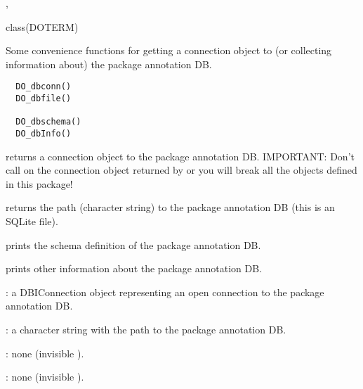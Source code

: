 \documentclass[a4paper]{book}
\begin{document}
%
\begin{SeeAlso}\relax
{},
\end{SeeAlso}
%
\begin{Examples}
\begin{ExampleCode}
   class(DOTERM)
\end{ExampleCode}
\end{Examples}
%
\begin{Description}\relax
Some convenience functions for getting a connection object to (or collecting
information about) the package annotation DB.
\end{Description}
%
\begin{Usage}
\begin{verbatim}
  DO_dbconn()
  DO_dbfile()

  DO_dbschema()
  DO_dbInfo()
\end{verbatim}
\end{Usage}
%
\begin{Details}\relax
{} returns a connection object to the
package annotation DB.  IMPORTANT: Don't call
 on the connection object
returned by  or you will break all the
 objects defined
in this package!

 returns the path (character string) to the
package annotation DB (this is an SQLite file).

 prints the schema definition of the
package annotation DB.

 prints other information about the package
annotation DB.
\end{Details}
%
\begin{Value}
: a DBIConnection object representing an
open connection to the package annotation DB.

: a character string with the path to the
package annotation DB.

: none (invisible ).

: none (invisible ).
\end{Value}
\end{document}
